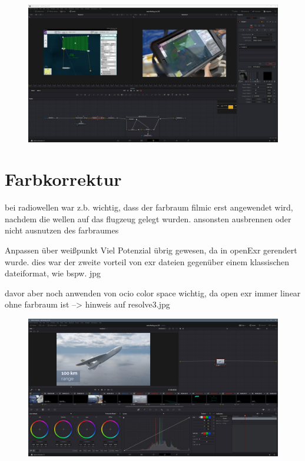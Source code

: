 \begin{figure}[H]
\begin{center}
\includegraphics[width=\textwidth]{gfx/post/resolve9.jpg}
\caption{}
\label{resolve9}
\end{center}
\end{figure}

\section{Farbkorrektur}



bei radiowellen war z.b. wichtig, dass der farbraum filmic erst angewendet wird, nachdem die wellen auf das flugzeug gelegt wurden. ansonsten ausbrennen oder nicht ausnutzen des farbraumes


Anpassen über weißpunkt
Viel Potenzial übrig gewesen, da in openExr gerendert wurde.
dies war der zweite vorteil von exr dateien gegenüber einem klassischen dateiformat, wie bspw. jpg

davor aber noch anwenden von ocio color space wichtig, da open exr immer linear ohne farbraum ist
--> hinweis auf resolve3.jpg



\begin{figure}[H]
\begin{center}
\includegraphics[width=\textwidth]{gfx/post/resolve7.jpg}
\caption{}
\label{resolve7}
\end{center}
\end{figure}


